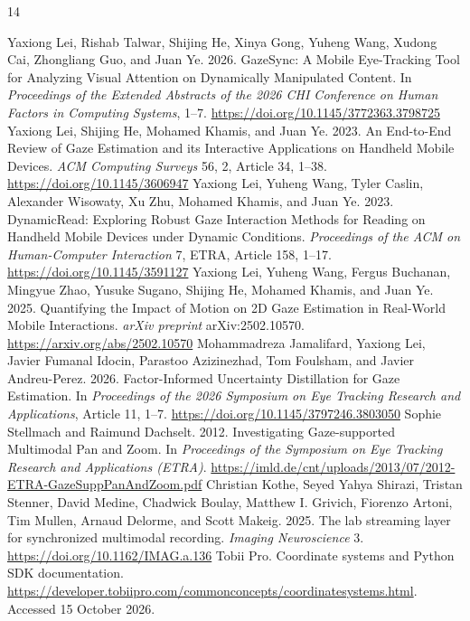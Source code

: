 \documentclass[sigconf,screen,nonacm]{acmart}
\begin{document}
\begin{thebibliography}{14}
\raggedright
{} Yaxiong Lei, Rishab Talwar, Shijing He, Xinya Gong, Yuheng Wang, Xudong Cai, Zhongliang Guo, and Juan Ye. 2026. GazeSync: A Mobile Eye-Tracking Tool for Analyzing Visual Attention on Dynamically Manipulated Content. In \textit{Proceedings of the Extended Abstracts of the 2026 CHI Conference on Human Factors in Computing Systems}, 1--7. \url{https://doi.org/10.1145/3772363.3798725}
 Yaxiong Lei, Shijing He, Mohamed Khamis, and Juan Ye. 2023. An End-to-End Review of Gaze Estimation and its Interactive Applications on Handheld Mobile Devices. \textit{ACM Computing Surveys} 56, 2, Article 34, 1--38. \url{https://doi.org/10.1145/3606947}
 Yaxiong Lei, Yuheng Wang, Tyler Caslin, Alexander Wisowaty, Xu Zhu, Mohamed Khamis, and Juan Ye. 2023. DynamicRead: Exploring Robust Gaze Interaction Methods for Reading on Handheld Mobile Devices under Dynamic Conditions. \textit{Proceedings of the ACM on Human-Computer Interaction} 7, ETRA, Article 158, 1--17. \url{https://doi.org/10.1145/3591127}
 Yaxiong Lei, Yuheng Wang, Fergus Buchanan, Mingyue Zhao, Yusuke Sugano, Shijing He, Mohamed Khamis, and Juan Ye. 2025. Quantifying the Impact of Motion on 2D Gaze Estimation in Real-World Mobile Interactions. \textit{arXiv preprint} arXiv:2502.10570. \url{https://arxiv.org/abs/2502.10570}
 Mohammadreza Jamalifard, Yaxiong Lei, Javier Fumanal Idocin, Parastoo Azizinezhad, Tom Foulsham, and Javier Andreu-Perez. 2026. Factor-Informed Uncertainty Distillation for Gaze Estimation. In \textit{Proceedings of the 2026 Symposium on Eye Tracking Research and Applications}, Article 11, 1--7. \url{https://doi.org/10.1145/3797246.3803050}
 Sophie Stellmach and Raimund Dachselt. 2012. Investigating Gaze-supported Multimodal Pan and Zoom. In \textit{Proceedings of the Symposium on Eye Tracking Research and Applications (ETRA)}. \url{https://imld.de/cnt/uploads/2013/07/2012-ETRA-GazeSuppPanAndZoom.pdf}
 Christian Kothe, Seyed Yahya Shirazi, Tristan Stenner, David Medine, Chadwick Boulay, Matthew I. Grivich, Fiorenzo Artoni, Tim Mullen, Arnaud Delorme, and Scott Makeig. 2025. The lab streaming layer for synchronized multimodal recording. \textit{Imaging Neuroscience} 3. \url{https://doi.org/10.1162/IMAG.a.136}
 Tobii Pro. Coordinate systems and Python SDK documentation. \url{https://developer.tobiipro.com/commonconcepts/coordinatesystems.html}. Accessed 15 October 2026.

\end{thebibliography}
\end{document}
